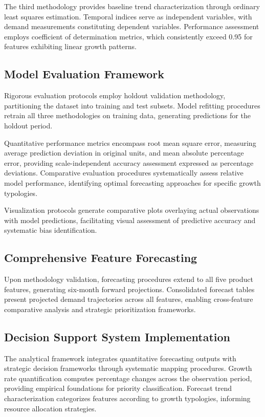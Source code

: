 The third methodology provides baseline trend characterization through ordinary least squares estimation. Temporal indices serve as independent variables, with demand measurements constituting dependent variables. Performance assessment employs coefficient of determination metrics, which consistently exceed 0.95 for features exhibiting linear growth patterns.

\subsection{Model Evaluation Framework}
Rigorous evaluation protocols employ holdout validation methodology, partitioning the dataset into training and test subsets. Model refitting procedures retrain all three methodologies on training data, generating predictions for the holdout period.

Quantitative performance metrics encompass root mean square error, measuring average prediction deviation in original units, and mean absolute percentage error, providing scale-independent accuracy assessment expressed as percentage deviations. Comparative evaluation procedures systematically assess relative model performance, identifying optimal forecasting approaches for specific growth typologies.

Visualization protocols generate comparative plots overlaying actual observations with model predictions, facilitating visual assessment of predictive accuracy and systematic bias identification.

\subsection{Comprehensive Feature Forecasting}
Upon methodology validation, forecasting procedures extend to all five product features, generating six-month forward projections. Consolidated forecast tables present projected demand trajectories across all features, enabling cross-feature comparative analysis and strategic prioritization frameworks.

\subsection{Decision Support System Implementation}
The analytical framework integrates quantitative forecasting outputs with strategic decision frameworks through systematic mapping procedures. Growth rate quantification computes percentage changes across the observation period, providing empirical foundations for priority classification. Forecast trend characterization categorizes features according to growth typologies, informing resource allocation strategies.

